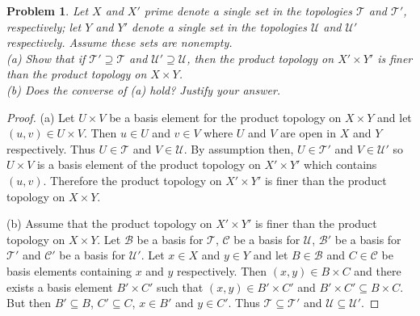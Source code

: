 \documentclass{article}
\newtheorem{problem}{Problem}
\begin{document}
\begin{problem}
Let $X$ and $X'$ prime denote a single set in the topologies $\mathcal{T}$ and $\mathcal{T}'$, respectively; let $Y$ and $Y'$ denote a single set in the topologies $\mathcal{U}$ and $\mathcal{U}'$ respectively. Assume these sets are nonempty.\\
(a) Show that if $\mathcal{T}' \supseteq \mathcal{T}$ and $\mathcal{U}' \supseteq \mathcal{U}$, then the product topology on $X' \times Y'$ is finer than the product topology on $X \times Y$.\\
(b) Does the converse of (a) hold? Justify your answer.
\end{problem}
\begin{proof}
(a) Let $U \times V$ be a basis element for the product topology on $X \times Y$ and let $(u,v) \in U \times V$. Then $u \in U$ and $v \in V$ where $U$ and $V$ are open in $X$ and $Y$ respectively. Thus $U \in \mathcal{T}$ and $V \in \mathcal{U}$. By assumption then, $U \in \mathcal{T}'$ and $V \in \mathcal{U}'$ so $U \times V$ is a basis element of the product topology on $X' \times Y'$ which contains $(u,v)$. Therefore the product topology on $X' \times Y'$ is finer than the product topology on $X \times Y$.

(b) Assume that the product topology on $X' \times Y'$ is finer than the product topology on $X \times Y$. Let $\mathcal{B}$ be a basis for $\mathcal{T}$, $\mathcal{C}$ be a basis for $\mathcal{U}$, $\mathcal{B}'$ be a basis for $\mathcal{T}'$ and $\mathcal{C}'$ be a basis for $\mathcal{U}'$. Let $x \in X$ and $y \in Y$ and let $B \in \mathcal{B}$ and $C \in \mathcal{C}$ be basis elements containing $x$ and $y$ respectively. Then $(x,y) \in B \times C$ and there exists a basis element $B' \times C'$ such that $(x,y) \in B' \times C'$ and $B' \times C' \subseteq B \times C$. But then $B' \subseteq B$, $C' \subseteq C$, $x \in B'$ and $y \in C'$.  Thus $\mathcal{T} \subseteq \mathcal{T}'$ and $\mathcal{U} \subseteq \mathcal{U}'$.
\end{proof}
\end{document}
